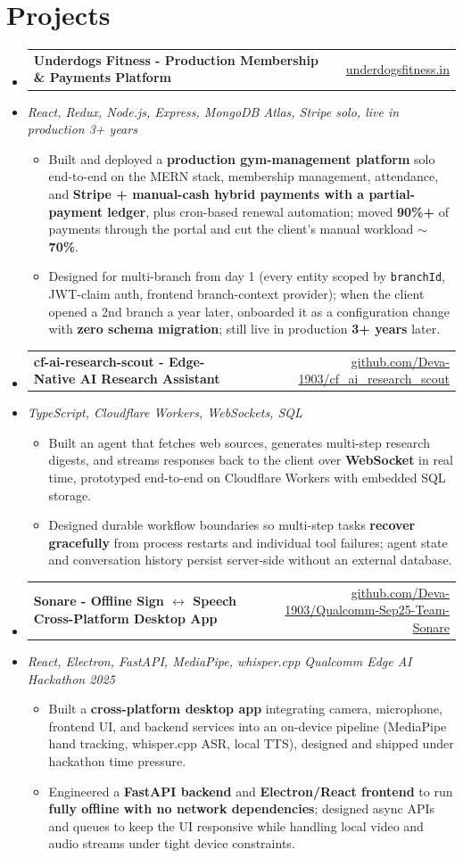 \documentclass[letterpaper,10pt]{article}
\makeatletter
\newcommand{\resumeItem}[1]{
  \item\small{#1\vspace{-1pt}}
}
\newcommand{\resumeProjectHeading}[2]{
    \item
    \begin{tabular*}{0.985\textwidth}[t]{l@{\extracolsep{\fill}}r}
      \small\textbf{#1} & \small #2 \\
    \end{tabular*}\vspace{-5pt}
}
\newcommand{\resumeProjectSubheading}[1]{
  \vspace{-2pt}\item[] {\small\textcolor{ResumeSlate}{\emph{#1}}}\vspace{-3pt}
}
\newcommand{\resumeSubHeadingListStart}{\begin{itemize}[leftmargin=0.0in, label={}, itemsep=2pt, topsep=2pt]}
\newcommand{\resumeSubHeadingListEnd}{\end{itemize}}
\newcommand{\resumeItemListStart}{\begin{itemize}[leftmargin=0.18in, itemsep=2pt, topsep=1pt]}
\newcommand{\resumeItemListEnd}{\end{itemize}\vspace{-4pt}}
\makeatother
\begin{document}
\section{Projects}
\resumeSubHeadingListStart
  \resumeProjectHeading
    {Underdogs Fitness - Production Membership \& Payments Platform}
    {\href{https://www.underdogsfitness.in/}{underdogsfitness.in}}
  \resumeProjectSubheading{React, Redux, Node.js, Express, MongoDB Atlas, Stripe \enspace\textbar\enspace solo, live in production 3+ years}
    \resumeItemListStart
      \resumeItem{Built and deployed a \textbf{production gym-management platform} solo end-to-end on the MERN stack, membership management, attendance, and \textbf{Stripe + manual-cash hybrid payments with a partial-payment ledger}, plus cron-based renewal automation; moved \textbf{90\%+} of payments through the portal and cut the client's manual workload \textbf{\(\sim\)70\%}.}
      \resumeItem{Designed for multi-branch from day 1 (every entity scoped by \texttt{branchId}, JWT-claim auth, frontend branch-context provider); when the client opened a 2nd branch a year later, onboarded it as a configuration change with \textbf{zero schema migration}; still live in production \textbf{3+ years} later.}
    \resumeItemListEnd
  \resumeProjectHeading
    {cf-ai-research-scout - Edge-Native AI Research Assistant}
    {\href{https://github.com/Deva-1903/cf_ai_research_scout}{github.com/Deva-1903/cf\_ai\_research\_scout}}
  \resumeProjectSubheading{TypeScript, Cloudflare Workers, WebSockets, SQL}
    \resumeItemListStart
      \resumeItem{Built an agent that fetches web sources, generates multi-step research digests, and streams responses back to the client over \textbf{WebSocket} in real time, prototyped end-to-end on Cloudflare Workers with embedded SQL storage.}
      \resumeItem{Designed durable workflow boundaries so multi-step tasks \textbf{recover gracefully} from process restarts and individual tool failures; agent state and conversation history persist server-side without an external database.}
    \resumeItemListEnd
  \resumeProjectHeading
    {Sonare - Offline Sign \(\leftrightarrow\) Speech Cross-Platform Desktop App}
    {\href{https://github.com/Deva-1903/Qualcomm-Sep25-Team-Sonare}{github.com/Deva-1903/Qualcomm-Sep25-Team-Sonare}}
  \resumeProjectSubheading{React, Electron, FastAPI, MediaPipe, whisper.cpp \enspace\textbar\enspace Qualcomm Edge AI Hackathon 2025}
    \resumeItemListStart
      \resumeItem{Built a \textbf{cross-platform desktop app} integrating camera, microphone, frontend UI, and backend services into an on-device pipeline (MediaPipe hand tracking, whisper.cpp ASR, local TTS), designed and shipped under hackathon time pressure.}
      \resumeItem{Engineered a \textbf{FastAPI backend} and \textbf{Electron/React frontend} to run \textbf{fully offline with no network dependencies}; designed async APIs and queues to keep the UI responsive while handling local video and audio streams under tight device constraints.}
    \resumeItemListEnd
\resumeSubHeadingListEnd
\vspace{-4pt}
\end{document}
